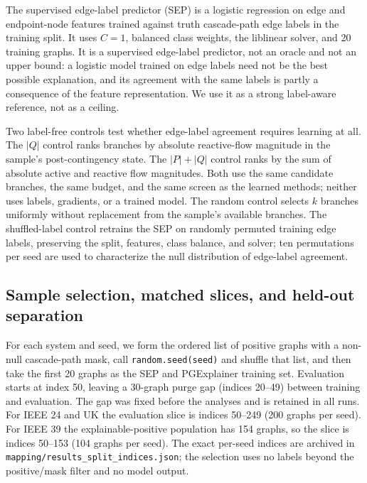 The supervised edge-label predictor (SEP) is a logistic regression on edge and endpoint-node features trained against truth cascade-path edge labels in the training split. It uses $C=1$, balanced class weights, the liblinear solver, and 20 training graphs. It is a supervised edge-label predictor, not an oracle and not an upper bound: a logistic model trained on edge labels need not be the best possible explanation, and its agreement with the same labels is partly a consequence of the feature representation. We use it as a strong label-aware reference, not as a ceiling.

Two label-free controls test whether edge-label agreement requires learning at all. The $|Q|$ control ranks branches by absolute reactive-flow magnitude in the sample's post-contingency state. The $|P|+|Q|$ control ranks by the sum of absolute active and reactive flow magnitudes. Both use the same candidate branches, the same budget, and the same screen as the learned methods; neither uses labels, gradients, or a trained model. The random control selects $k$ branches uniformly without replacement from the sample's available branches. The shuffled-label control retrains the SEP on randomly permuted training edge labels, preserving the split, features, class balance, and solver; ten permutations per seed are used to characterize the null distribution of edge-label agreement.

\subsection{Sample selection, matched slices, and held-out separation}\label{sample_selection}

For each system and seed, we form the ordered list of positive graphs with a non-null cascade-path mask, call \texttt{random.seed(seed)} and shuffle that list, and then take the first 20 graphs as the SEP and PGExplainer training set. Evaluation starts at index 50, leaving a 30-graph purge gap (indices 20--49) between training and evaluation. The gap was fixed before the analyses and is retained in all runs. For IEEE 24 and UK the evaluation slice is indices 50--249 (200 graphs per seed). For IEEE 39 the explainable-positive population has 154 graphs, so the slice is indices 50--153 (104 graphs per seed). The exact per-seed indices are archived in \texttt{mapping/results\_split\_indices.json}; the selection uses no labels beyond the positive/mask filter and no model output.


